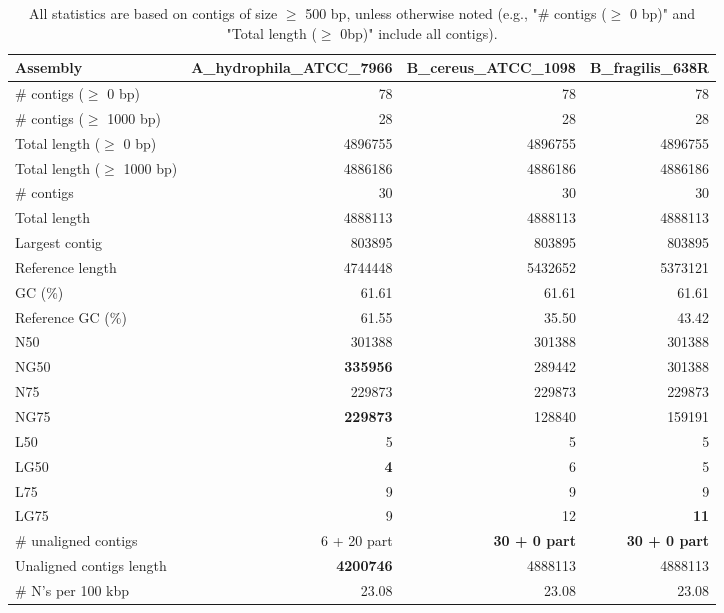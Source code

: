 \documentclass[12pt,a4paper]{article}
\begin{document}
\begin{table}[ht]
\begin{center}
\caption{All statistics are based on contigs of size $\geq$ 500 bp, unless otherwise noted (e.g., "\# contigs ($\geq$ 0 bp)" and "Total length ($\geq$ 0bp)" include all contigs).}
\begin{tabular}{|l*{3}{|r}|}
\hline
Assembly & A\_hydrophila\_ATCC\_7966 & B\_cereus\_ATCC\_1098 & B\_fragilis\_638R \\ \hline
\# contigs ($\geq$ 0 bp) & 78 & 78 & 78 \\ \hline
\# contigs ($\geq$ 1000 bp) & 28 & 28 & 28 \\ \hline
Total length ($\geq$ 0 bp) & 4896755 & 4896755 & 4896755 \\ \hline
Total length ($\geq$ 1000 bp) & 4886186 & 4886186 & 4886186 \\ \hline
\# contigs & 30 & 30 & 30 \\ \hline
Total length & 4888113 & 4888113 & 4888113 \\ \hline
Largest contig & 803895 & 803895 & 803895 \\ \hline
Reference length & 4744448 & 5432652 & 5373121 \\ \hline
GC (\%) & 61.61 & 61.61 & 61.61 \\ \hline
Reference GC (\%) & 61.55 & 35.50 & 43.42 \\ \hline
N50 & 301388 & 301388 & 301388 \\ \hline
NG50 & {\bf 335956} & 289442 & 301388 \\ \hline
N75 & 229873 & 229873 & 229873 \\ \hline
NG75 & {\bf 229873} & 128840 & 159191 \\ \hline
L50 & 5 & 5 & 5 \\ \hline
LG50 & {\bf 4} & 6 & 5 \\ \hline
L75 & 9 & 9 & 9 \\ \hline
LG75 & 9 & 12 & {\bf 11} \\ \hline
\# unaligned contigs & 6 + 20 part & {\bf 30 + 0 part} & {\bf 30 + 0 part} \\ \hline
Unaligned contigs length & {\bf 4200746} & 4888113 & 4888113 \\ \hline
\# N's per 100 kbp & 23.08 & 23.08 & 23.08 \\ \hline
\end{tabular}
\end{center}
\end{table}
\end{document}
